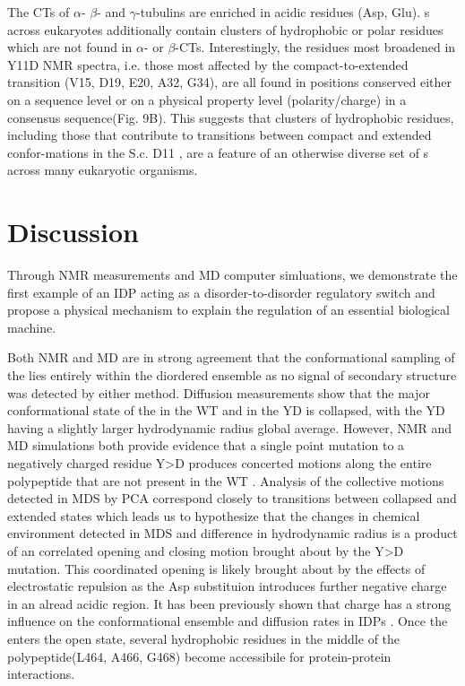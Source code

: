 The CTs of $\alpha$- $\beta$- and $\gamma$-tubulins are enriched in acidic residues (Asp, Glu). \gct s across eukaryotes additionally contain clusters of hydrophobic or polar residues which are not found in $\alpha$- or $\beta$-CTs. Interestingly, the residues most broadened in Y11D NMR spectra, i.e. those most affected by the compact-to-extended transition (V15, D19, E20, A32, G34), are all found in positions conserved either on a sequence level or on a physical property level (polarity/charge) in a consensus \gct sequence(Fig. 9B). This suggests that clusters of hydrophobic residues, including those that contribute to transitions between compact and extended confor-mations in the S.c. D11 \gct, are a feature of an otherwise diverse set of \gct s across many eukaryotic organisms.


\section{Discussion}

Through NMR measurements and MD computer simluations, we demonstrate the first example of an IDP acting as a disorder-to-disorder regulatory switch and propose a physical mechanism to explain the regulation of an essential biological machine. 

Both NMR and MD are in strong agreement that the conformational sampling of the \gct lies entirely within the diordered ensemble as no signal of secondary structure was detected by either method. Diffusion measurements show that the major conformational state of the \gct in the WT and in the YD is collapsed, with the YD having a slightly larger hydrodynamic radius global average. However, NMR and MD simulations both provide evidence that a single point mutation to a negatively charged residue Y>D produces concerted motions along the entire polypeptide that are not present in the WT \gct. Analysis of the collective motions detected in MDS by PCA correspond closely to transitions between collapsed and extended states which leads us to hypothesize that the changes in chemical environment detected in MDS and difference in hydrodynamic radius is a product of an correlated opening and closing motion brought about by the Y>D mutation. This coordinated opening is likely brought about by the effects of electrostatic repulsion as the Asp substituion introduces further negative charge in an alread acidic region. It has been previously shown that charge has a strong influence on the conformational ensemble and diffusion rates in IDPs \cite{mao2010net}. Once the \gct enters the open state, several hydrophobic residues in the middle of the polypeptide(L464, A466, G468) become accessibile for protein-protein interactions.

